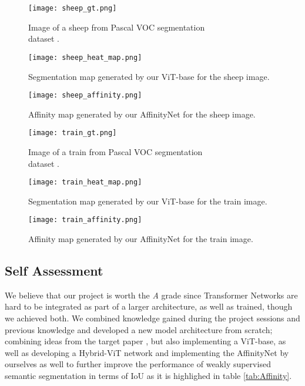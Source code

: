 \documentclass{article}
\begin{document}
\begin{figure}[H]
  \texttt{[image: sheep\_gt.png]}
  \caption{Image of a sheep from Pascal VOC segmentation \\dataset \cite{ahn2018learning}.}
  \label{fig:sheep_gt}
\endminipage\hfill
{}
  \texttt{[image: sheep\_heat\_map.png]}
  \caption{Segmentation map generated by our ViT-base for the sheep image.}
  \label{fig:sheep_heat_map}
\endminipage\hfill
{}%
  \texttt{[image: sheep\_affinity.png]}
  \caption{Affinity map generated by our AffinityNet for the sheep image.}
  \label{fig:sheep_aff}
\endminipage
\end{figure}

\begin{figure}[H]
  \texttt{[image: train\_gt.png]}
  \caption{Image of a train from Pascal VOC segmentation \\dataset \cite{ahn2018learning}.}
  \label{fig:train_gt}
\endminipage\hfill
{}
  \texttt{[image: train\_heat\_map.png]}
  \caption{Segmentation map generated by our ViT-base for the train image.}
  \label{fig:train_heat_map}
\endminipage\hfill
{}%
  \texttt{[image: train\_affinity.png]}
  \caption{Affinity map generated by our AffinityNet for the train image.}
  \label{fig:train_aff}
\endminipage
\end{figure}

\subsection*{Self Assessment}

We believe that our project is worth the \textit{A} grade since Transformer Networks are hard to be integrated as part of a larger architecture, as well as trained, though we achieved both.  We combined knowledge gained during the project sessions and previous knowledge and developed a new model architecture from scratch; combining ideas from the target paper \cite{mainpaper}, but also implementing a ViT-base, as well as developing a Hybrid-ViT network and implementing the AffinityNet \cite{ahn2018learning} by ourselves as well to further improve the performance of weakly supervised semantic segmentation in terms of IoU as it is highlighed in table \ref{tab:Affinity}.
\end{document}

